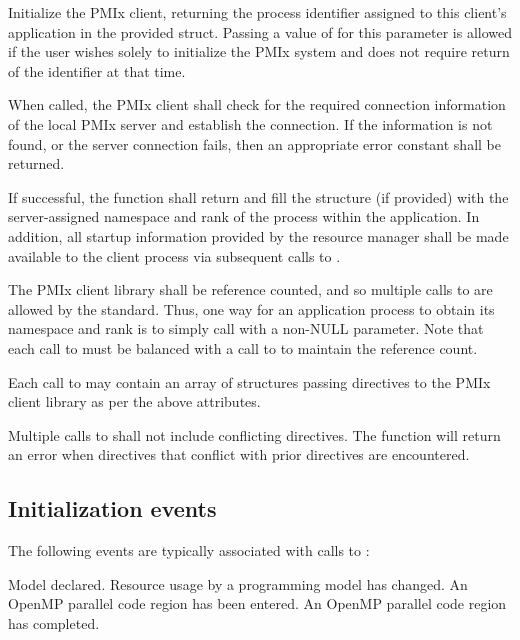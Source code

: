 \optattrend

\descr

Initialize the \ac{PMIx} client, returning the process identifier assigned to this client's application in the provided  struct.
Passing a value of  for this parameter is allowed if the user wishes solely to initialize the \ac{PMIx} system and does not require return of the identifier at that time.

When called, the \ac{PMIx} client shall check for the required connection information of the local \ac{PMIx} server and establish the connection.
If the information is not found, or the server connection fails, then an appropriate error constant shall be returned.

If successful, the function shall return  and fill the  structure (if provided) with the server-assigned namespace and rank of the process within the application.
In addition, all startup information provided by the resource manager shall be made available to the client process via subsequent calls to .

The \ac{PMIx} client library shall be reference counted, and so multiple calls to  are allowed by the standard.
Thus, one way for an application process to obtain its namespace and rank is to simply call  with a non-NULL  parameter.
Note that each call to  must be balanced with a call to  to maintain the reference count.

Each call to  may contain an array of  structures passing directives to the \ac{PMIx} client library as per the above attributes.

Multiple calls to  shall not include conflicting directives.
The  function will return an error when directives that conflict with prior directives are encountered.

\subsection{Initialization events}

The following events are typically associated with calls to :

\begin{constantdesc}
%
Model declared.
%
Resource usage by a programming model has changed.
%
An OpenMP parallel code region has been entered.
%
An OpenMP parallel code region has completed.
%
\end{constantdesc}

